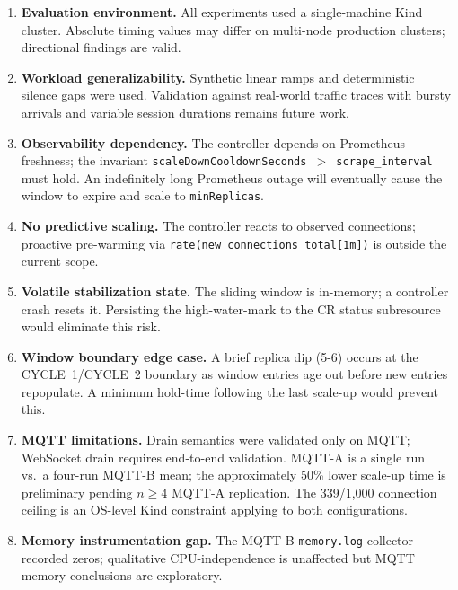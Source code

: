 \documentclass[3p,twocolumn]{elsarticle}
\theoremstyle{plain}%
\theoremstyle{definition}%
\begin{document}
\begin{enumerate}[leftmargin=*]

\item \textbf{Evaluation environment.} All experiments used a single-machine Kind cluster. Absolute timing values may differ on multi-node production clusters; directional findings are valid.

\item \textbf{Workload generalizability.} Synthetic linear ramps and deterministic silence gaps were used. Validation against real-world traffic traces with bursty arrivals and variable session durations remains future work.

\item \textbf{Observability dependency.} The controller depends on Prometheus freshness; the invariant \texttt{scaleDownCooldownSeconds $>$ scrape\_interval} must hold. An indefinitely long Prometheus outage will eventually cause the window to expire and scale to \texttt{minReplicas}.

\item \textbf{No predictive scaling.} The controller reacts to observed connections; proactive pre-warming via \texttt{rate(new\_connections\_total[1m])} is outside the current scope.

\item \textbf{Volatile stabilization state.} The sliding window is in-memory; a controller crash resets it. Persisting the high-water-mark to the CR status subresource would eliminate this risk.

\item \textbf{Window boundary edge case.} A brief replica dip (5-6) occurs at the CYCLE~1/CYCLE~2 boundary as window entries age out before new entries repopulate. A minimum hold-time following the last scale-up would prevent this.

\item \textbf{MQTT limitations.} Drain semantics were validated only on MQTT; WebSocket drain requires end-to-end validation. MQTT-A is a single run vs.~a four-run MQTT-B mean; the approximately 50\% lower scale-up time is preliminary pending $n\geq4$ MQTT-A replication. The 339/1{,}000 connection ceiling is an OS-level Kind constraint applying to both configurations.

\item \textbf{Memory instrumentation gap.} The MQTT-B \texttt{memory.log} collector recorded zeros; qualitative CPU-independence is unaffected but MQTT memory conclusions are exploratory.


\end{enumerate}
\end{document}
